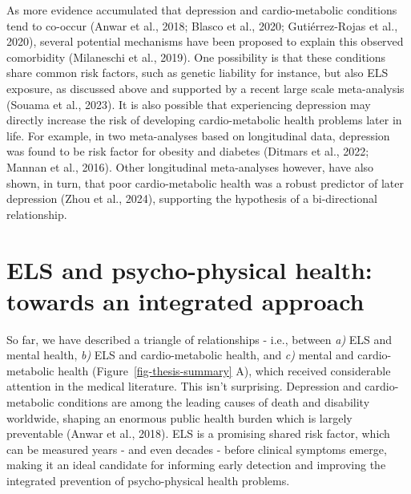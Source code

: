 \documentclass[
  letterpaper,
  DIV=11,
  numbers=noendperiod]{scrreport}
\begin{document}
As more evidence accumulated that depression and cardio-metabolic
conditions tend to co-occur (Anwar et al., 2018; Blasco et al., 2020;
Gutiérrez-Rojas et al., 2020), several potential mechanisms have been
proposed to explain this observed comorbidity (Milaneschi et al., 2019).
One possibility is that these conditions share common risk factors, such
as genetic liability for instance, but also ELS exposure, as discussed
above and supported by a recent large scale meta-analysis (Souama et
al., 2023). It is also possible that experiencing depression may
directly increase the risk of developing cardio-metabolic health
problems later in life. For example, in two meta-analyses based on
longitudinal data, depression was found to be risk factor for obesity
and diabetes (Ditmars et al., 2022; Mannan et al., 2016). Other
longitudinal meta-analyses however, have also shown, in turn, that poor
cardio-metabolic health was a robust predictor of later depression (Zhou
et al., 2024), supporting the hypothesis of a bi-directional
relationship.

\section{ELS and psycho-physical health: towards an integrated
approach}\label{els-and-psycho-physical-health-towards-an-integrated-approach}

So far, we have described a triangle of relationships - i.e., between
\emph{a)} ELS and mental health, \emph{b)} ELS and cardio-metabolic
health, and \emph{c)} mental and cardio-metabolic health
(Figure~\ref{fig-thesis-summary} A), which received considerable
attention in the medical literature. This isn't surprising. Depression
and cardio-metabolic conditions are among the leading causes of death
and disability worldwide, shaping an enormous public health burden which
is largely preventable (Anwar et al., 2018). ELS is a promising shared
risk factor, which can be measured years - and even decades - before
clinical symptoms emerge, making it an ideal candidate for informing
early detection and improving the integrated prevention of
psycho-physical health problems.
\end{document}
